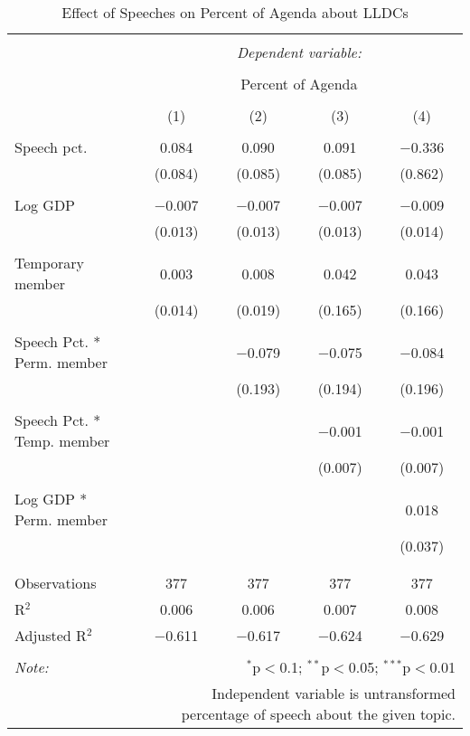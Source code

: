 
\begin{table}[!htbp] \centering 
  \caption{Effect of Speeches on Percent of Agenda about  LLDCs} 
  \label{} 
\begin{tabular}{@{\extracolsep{5pt}}lcccc} 
\\[-1.8ex]\hline 
\hline \\[-1.8ex] 
 & \multicolumn{4}{c}{\textit{Dependent variable:}} \\ 
\cline{2-5} 
\\[-1.8ex] & \multicolumn{4}{c}{Percent of Agenda} \\ 
\\[-1.8ex] & (1) & (2) & (3) & (4)\\ 
\hline \\[-1.8ex] 
 Speech pct. & 0.084 & 0.090 & 0.091 & $-$0.336 \\ 
  & (0.084) & (0.085) & (0.085) & (0.862) \\ 
  & & & & \\ 
 Log GDP & $-$0.007 & $-$0.007 & $-$0.007 & $-$0.009 \\ 
  & (0.013) & (0.013) & (0.013) & (0.014) \\ 
  & & & & \\ 
 Temporary member & 0.003 & 0.008 & 0.042 & 0.043 \\ 
  & (0.014) & (0.019) & (0.165) & (0.166) \\ 
  & & & & \\ 
 Speech Pct. * Perm. member &  & $-$0.079 & $-$0.075 & $-$0.084 \\ 
  &  & (0.193) & (0.194) & (0.196) \\ 
  & & & & \\ 
 Speech Pct. * Temp. member &  &  & $-$0.001 & $-$0.001 \\ 
  &  &  & (0.007) & (0.007) \\ 
  & & & & \\ 
 Log GDP * Perm. member &  &  &  & 0.018 \\ 
  &  &  &  & (0.037) \\ 
  & & & & \\ 
\hline \\[-1.8ex] 
Observations & 377 & 377 & 377 & 377 \\ 
R$^{2}$ & 0.006 & 0.006 & 0.007 & 0.008 \\ 
Adjusted R$^{2}$ & $-$0.611 & $-$0.617 & $-$0.624 & $-$0.629 \\ 
\hline 
\hline \\[-1.8ex] 
\textit{Note:}  & \multicolumn{4}{r}{$^{*}$p$<$0.1; $^{**}$p$<$0.05; $^{***}$p$<$0.01} \\ 
 & \multicolumn{4}{r}{Independent variable is untransformed percentage of speech about the given topic.} \\ 
\end{tabular} 
\end{table} 
